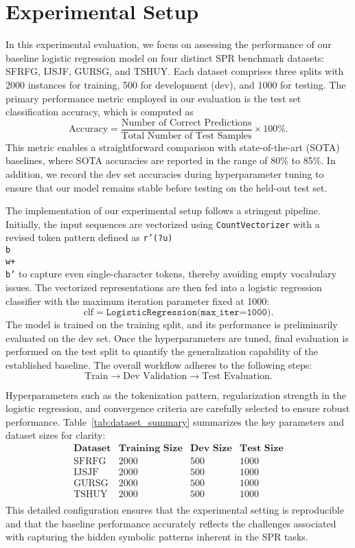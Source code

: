 \documentclass{article}
\begin{document}
\section{Experimental Setup}
In this experimental evaluation, we focus on assessing the performance of our baseline logistic regression model on four distinct SPR benchmark datasets: SFRFG, IJSJF, GURSG, and TSHUY. Each dataset comprises three splits with 2000 instances for training, 500 for development (dev), and 1000 for testing. The primary performance metric employed in our evaluation is the test set classification accuracy, which is computed as
\[
\text{Accuracy} = \frac{\text{Number of Correct Predictions}}{\text{Total Number of Test Samples}} \times 100\%.
\]
This metric enables a straightforward comparison with state-of-the-art (SOTA) baselines, where SOTA accuracies are reported in the range of 80\% to 85\%. In addition, we record the dev set accuracies during hyperparameter tuning to ensure that our model remains stable before testing on the held-out test set.

The implementation of our experimental setup follows a stringent pipeline. Initially, the input sequences are vectorized using \texttt{CountVectorizer} with a revised token pattern defined as \texttt{r'(?u)\\b\\w+\\b'} to capture even single-character tokens, thereby avoiding empty vocabulary issues. The vectorized representations are then fed into a logistic regression classifier with the maximum iteration parameter fixed at 1000:
\[
\text{clf} = \texttt{LogisticRegression(max\_iter=1000)}.
\]
The model is trained on the training split, and its performance is preliminarily evaluated on the dev set. Once the hyperparameters are tuned, final evaluation is performed on the test split to quantify the generalization capability of the established baseline. The overall workflow adheres to the following steps:
\[
\text{Train} \rightarrow \text{Dev Validation} \rightarrow \text{Test Evaluation}.
\]

Hyperparameters such as the tokenization pattern, regularization strength in the logistic regression, and convergence criteria are carefully selected to ensure robust performance. Table~\ref{tab:dataset_summary} summarizes the key parameters and dataset sizes for clarity:
\[
\begin{array}{l|c|c|c}
\textbf{Dataset} & \textbf{Training Size} & \textbf{Dev Size} & \textbf{Test Size} \\ \hline
\text{SFRFG} & 2000 & 500 & 1000 \\
\text{IJSJF} & 2000 & 500 & 1000 \\
\text{GURSG} & 2000 & 500 & 1000 \\
\text{TSHUY} & 2000 & 500 & 1000 \\
\end{array}
\]
This detailed configuration ensures that the experimental setting is reproducible and that the baseline performance accurately reflects the challenges associated with capturing the hidden symbolic patterns inherent in the SPR tasks.
\end{document}
